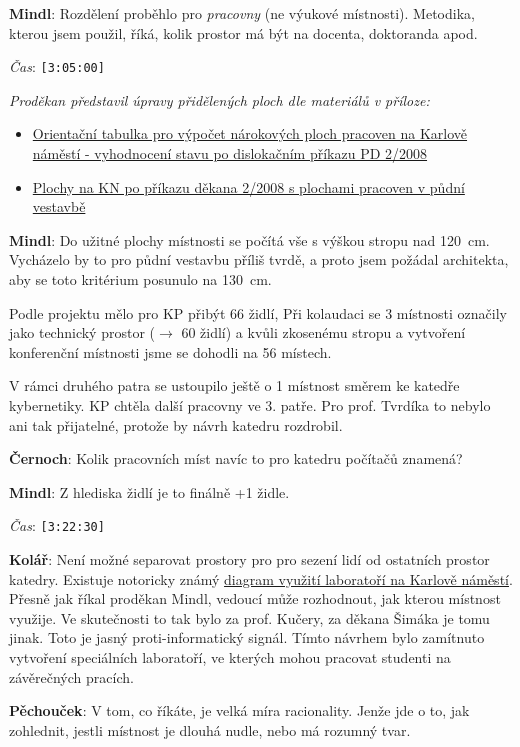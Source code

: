 \documentclass[a4paper,10pt,notitlepage]{article}
\newcommand{\ts}[1]{\texttt{[#1]}}
\newcommand{\tsp}[1]{\noindent \textit{Čas}: \ts{#1}}
\newcommand{\cl}[1]{\noindent \textbf{#1}:}
\newcommand{\tourl}[1]{http://www.fel.cvut.cz/senat/zapisy/#1}
\begin{document}
\cl{Mindl} Rozdělení proběhlo pro \textit{pracovny} (ne výukové místnosti). Metodika, kterou jsem použil, říká, kolik prostor má být na docenta, doktoranda apod.

\tsp{3:05:00}

\noindent \textit{Proděkan představil úpravy přidělených ploch dle materiálů v příloze:}
\begin{itemize}
\item \href{\tourl{zapis12-narokovane_plochy.xls}}{Orientační tabulka pro výpočet nárokových ploch pracoven na Karlově náměstí - vyhodnocení stavu po dislokačním příkazu PD 2/2008}
\item \href{\tourl{zapis12-plochy_dle_rozdeleni.xls}}{Plochy na KN po příkazu děkana 2/2008 s plochami pracoven v půdní vestavbě}
\end{itemize}

\cl{Mindl} Do užitné plochy místnosti se počítá vše s výškou stropu nad 120~cm. Vycházelo by to pro půdní vestavbu příliš tvrdě, a proto jsem požádal architekta, aby se toto kritérium posunulo na 130~cm.

Podle projektu mělo pro KP přibýt 66 židlí, Při kolaudaci se 3 místnosti označily jako technický prostor ($\rightarrow$ 60 židlí) a kvůli zkosenému stropu a vytvoření konferenční místnosti jsme se dohodli na 56 místech.

V rámci druhého patra se ustoupilo ještě o 1 místnost směrem ke katedře kybernetiky. KP chtěla další pracovny ve 3. patře. Pro prof. Tvrdíka to nebylo ani tak přijatelné, protože by návrh katedru rozdrobil.

\cl{Černoch} Kolik pracovních míst navíc to pro katedru počítačů znamená?

\cl{Mindl} Z hlediska židlí je to finálně +1 židle.

\medskip

\tsp{3:22:30}

\cl{Kolář} Není možné separovat prostory pro pro sezení lidí od ostatních prostor katedry. Existuje notoricky známý \href{\tourl{zapis12-vyuziti_laboratori.png}}{diagram využití laboratoří na Karlově náměstí}. Přesně jak říkal proděkan Mindl, vedoucí může rozhodnout, jak kterou místnost využije. Ve skutečnosti to tak bylo za prof. Kučery, za děkana Šimáka je tomu jinak. Toto je jasný proti-informatický signál. Tímto návrhem bylo zamítnuto vytvoření speciálních laboratoří, ve kterých mohou pracovat studenti na závěrečných pracích.

\cl{Pěchouček} V tom, co říkáte, je velká míra racionality. Jenže jde o to, jak zohlednit, jestli místnost je dlouhá nudle, nebo má rozumný tvar.
\end{document}
